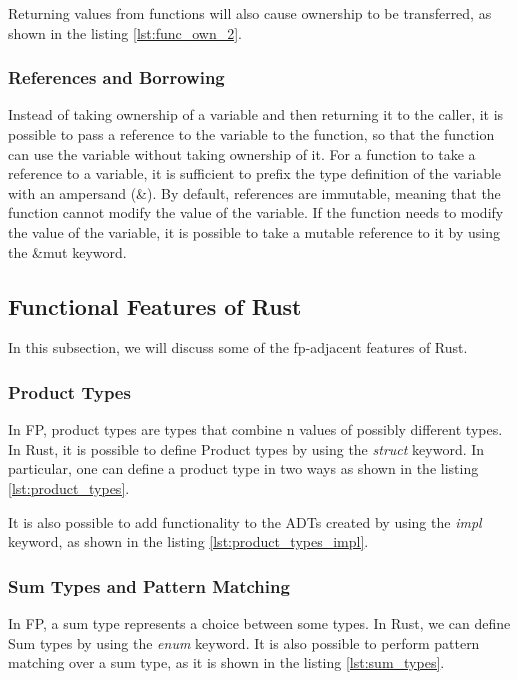 Returning values from functions will also cause ownership to be transferred, as shown in the listing \ref{lst:func_own_2}.



\subsubsection{References and Borrowing}
Instead of taking ownership of a variable and then returning it to the caller, it is possible to pass a reference to the variable to the function, so that the function can use the variable without taking ownership of it.
For a function to take a reference to a variable, it is sufficient to prefix the type definition of the variable with an ampersand (\&).
By default, references are immutable, meaning that the function cannot modify the value of the variable. If the function needs to modify the value of the variable, it is possible to take a mutable reference to it by using the \&mut keyword.

\subsection{Functional Features of Rust}
In this subsection, we will discuss some of the \ac{fp}-adjacent features of Rust.

\subsubsection{Product Types}
In FP, product types are types that combine n values of possibly different types. In Rust, it is possible to define Product types by using the \textit{struct} keyword. In particular, one can define a product type in two ways as shown in the listing \ref{lst:product_types}.



It is also possible to add functionality to the ADTs created by using the \textit{impl} keyword, as shown in the listing \ref{lst:product_types_impl}.



\subsubsection{Sum Types and Pattern Matching}
In FP, a sum type represents a choice between some types. In Rust, we can define Sum types by using the \textit{enum} keyword. It is also possible to perform pattern matching over a sum type, as it is shown in the listing \ref{lst:sum_types}.

